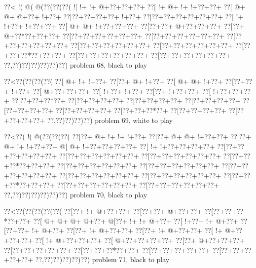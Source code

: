 \vbox{\vbox{\goo
\0??<\- !(\- @(\- @(\0??(\0??(\0??(
\- ![\- !+\- !+\- @+\0??+\0??+\0??+
\0??[\- !+\- @+\- !+\- !+\0??+\0??+
\0??[\- @+\- @+\- @+\0??+\- !+\0??+
\0??[\0??+\0??+\0??+\0??+\- !+\0??+
\0??[\0??+\0??+\0??+\0??+\0??+\0??+
\0??[\- !+\- !+\0??+\- !+\0??+\0??+
\0??[\- @+\- @+\- !+\0??+\0??+\0??+
\0??[\0??+\0??+\- @+\0??+\0??+\0??+
\0??[\0??+\- @+\0??*\0??+\0??+\0??+
\0??[\0??+\0??+\0??+\0??+\0??+\0??+
\0??[\0??+\0??+\0??+\0??+\0??+\0??+
\0??[\0??+\0??+\0??+\0??+\0??+\0??+
\0??[\0??+\0??+\0??+\0??+\0??+\0??+
\0??[\0??+\0??+\0??+\0??+\0??+\0??+
\0??[\0??+\0??+\0??*\0??+\0??+\0??+
\0??[\0??+\0??+\0??+\0??+\0??+\0??+
\0??[\0??+\0??+\0??+\0??+\0??+\0??+
\0??,\0??)\0??)\0??)\0??)\0??)\0??)
}
\hfil problem 68, black to play\hfil\break
}

\vbox{\vbox{\goo
\0??<\0??(\0??(\0??(\0??(
\0??[\- @+\- !+\- !+\0??+
\0??[\0??+\- @+\- !+\0??+
\0??[\- @+\- @+\- !+\0??+
\0??[\0??+\0??+\- !+\0??+
\0??[\- @+\0??+\0??+\0??+
\0??[\- !+\0??+\- !+\0??+
\0??[\0??+\- !+\0??+\0??+
\0??[\- !+\0??+\0??+\0??+
\0??[\0??+\0??+\0??*\0??+
\0??[\0??+\0??+\0??+\0??+
\0??[\0??+\0??+\0??+\0??+
\0??[\0??+\0??+\0??+\0??+
\0??[\0??+\0??+\0??+\0??+
\0??[\0??+\0??+\0??+\0??+
\0??[\0??+\0??+\0??*\0??+
\0??[\0??+\0??+\0??+\0??+
\0??[\0??+\0??+\0??+\0??+
\0??,\0??)\0??)\0??)\0??)
}
\hfil problem 69, white to play\hfil\break
}

\vbox{\vbox{\goo
\0??<\0??(\- !(\- @(\0??(\0??(\0??(
\0??[\0??+\- @+\- !+\- !+\- !+\0??+
\0??[\0??+\- @+\- @+\- !+\0??+\0??+
\0??[\0??+\- @+\- !+\- !+\0??+\0??+
\- @[\- @+\- !+\0??+\0??+\0??+\0??+
\0??[\- !+\- !+\0??+\0??+\0??+\0??+
\0??[\0??+\0??+\0??+\0??+\0??+\0??+
\0??[\0??+\0??+\0??+\0??+\0??+\0??+
\0??[\0??+\0??+\0??+\0??+\0??+\0??+
\0??[\0??+\0??+\0??*\0??+\0??+\0??+
\0??[\0??+\0??+\0??+\0??+\0??+\0??+
\0??[\0??+\0??+\0??+\0??+\0??+\0??+
\0??[\0??+\0??+\0??+\0??+\0??+\0??+
\0??[\0??+\0??+\0??+\0??+\0??+\0??+
\0??[\0??+\0??+\0??+\0??+\0??+\0??+
\0??[\0??+\0??+\0??*\0??+\0??+\0??+
\0??[\0??+\0??+\0??+\0??+\0??+\0??+
\0??[\0??+\0??+\0??+\0??+\0??+\0??+
\0??,\0??)\0??)\0??)\0??)\0??)\0??)
}
\hfil problem 70, black to play\hfil\break
}

\vbox{\vbox{\goo
\0??<\0??(\0??(\0??(\0??(\0??(
\0??[\0??+\- !+\- @+\0??+\0??+
\0??[\0??+\0??+\- @+\0??+\0??+
\0??[\0??+\0??+\0??*\0??+\0??+
\0??[\- @+\- @+\- @+\- @+\0??+
\- @[\0??+\- !+\- !+\- @+\0??+
\0??[\- !+\0??+\- !+\- @+\0??+
\0??[\0??+\0??+\- !+\- @+\0??+
\0??[\0??+\- !+\- @+\0??+\0??+
\0??[\0??+\- !+\- @+\0??+\0??+
\0??[\- !+\- @+\0??+\0??+\0??+
\0??[\- !+\- @+\0??+\0??+\0??+
\0??[\- @+\0??+\0??+\0??+\0??+
\0??[\0??+\- @+\0??+\0??+\0??+
\0??[\0??+\0??+\0??+\0??+\0??+
\0??[\0??+\0??+\0??*\0??+\0??+
\0??[\0??+\0??+\0??+\0??+\0??+
\0??[\0??+\0??+\0??+\0??+\0??+
\0??,\0??)\0??)\0??)\0??)\0??)
}
\hfil problem 71, black to play\hfil\break
}

